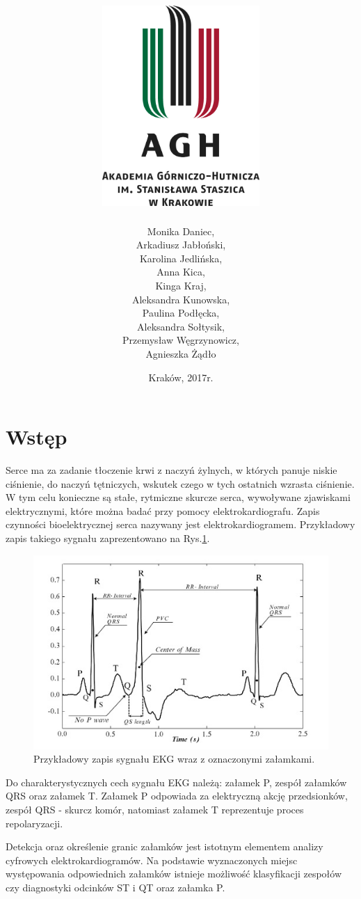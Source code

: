 \documentclass[10pt,a4paper]{article}
\title{
	\includegraphics[width=6cm]{logoAGH}\\
	\bigskip {Detekcja zespołów QRS} \bigskip	
}
\author{
Monika Daniec,\\
Arkadiusz Jabłoński,\\
Karolina Jedlińska,\\
Anna Kica,\\
Kinga Kraj,\\
Aleksandra Kunowska,\\
Paulina Podłęcka,\\
Aleksandra Sołtysik,\\
Przemysław Węgrzynowicz,\\
Agnieszka Żądło
}
\date{\bigskip \bigskip Kraków, 2017r.}
\begin{document}
\maketitle
\newpage
\tableofcontents

\newpage
\section{Wstęp}

Serce ma za zadanie tłoczenie krwi z naczyń żylnych, w których panuje niskie ciśnienie, do naczyń tętniczych, wskutek czego w tych ostatnich wzrasta ciśnienie. W tym celu konieczne są stałe, rytmiczne skurcze serca, wywoływane zjawiskami elektrycznymi, które można badać przy pomocy elektrokardiografu. Zapis czynności bioelektrycznej serca nazywany jest elektrokardiogramem. \cite{Hoser} Przykładowy zapis takiego sygnału zaprezentowano na Rys.\ref{QRS}.

\medskip
\begin{figure}[h]
\centering
\includegraphics[width=\textwidth]{QRS}
\caption{Przykładowy zapis sygnału EKG wraz z oznaczonymi załamkami. \cite{obrazek} }
\label{QRS}
\end{figure} 
\medskip

Do charakterystycznych cech sygnału EKG należą: załamek P, zespół załamków QRS oraz załamek T. Załamek P odpowiada za elektryczną akcję przedsionków, zespół QRS - skurcz komór, natomiast załamek T reprezentuje proces repolaryzacji.\cite{EKG dla praktyka}

Detekcja oraz określenie granic załamków jest istotnym elementem analizy cyfrowych elektrokardiogramów. Na podstawie wyznaczonych miejsc występowania odpowiednich załamków istnieje możliwość klasyfikacji zespołów czy diagnostyki odcinków ST i QT oraz załamka P. \cite{lab}
\end{document}
